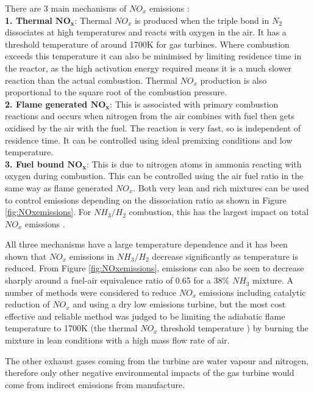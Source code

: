 There are 3 main mechanisms of $NO_x$ emissions \cite{netl}:\\ 
\textbf{1. Thermal $\mathbf{NO_x}$}: Thermal $NO_x$ is produced when the triple bond in $N_2$ dissociates at high temperatures and reacts with oxygen in the air. It has a threshold temperature of around 1700K for gas turbines. Where combustion exceeds this temperature it can also be minimised by limiting residence time in the reactor, as the high activation energy required means it is a much slower reaction than the actual combustion. Thermal $NO_x$ production is also proportional to the square root of the combustion pressure.
\\\textbf{2. Flame generated $\mathbf{NO_x}$}: This is associated with primary combustion reactions and occurs when nitrogen from the air combines with fuel then gets oxidised by the air with the fuel. The reaction is very fast, so is independent of residence time. It can be controlled using ideal premixing conditions and low temperature.
\\\textbf{3. Fuel bound $\mathbf{NO_x}$}: This is due to nitrogen atoms in ammonia reacting with oxygen during combustion. This can be controlled using the air fuel ratio in the same way as flame generated $NO_x$. Both very lean and rich mixtures can be used to control emissions depending on the dissociation ratio as shown in Figure \ref{fig:NOxemissions}. For $NH_3/H_2$ combustion, this has the largest impact on total $NO_x$ emissions \cite{junLi}. 
  
All three mechanisms have a large temperature dependence and it has been shown that $NO_x$ emissions in $NH_3/H_2$ decrease significantly as temperature is reduced. From Figure \ref{fig:NOxemissions}, emissions can also be seen to decrease sharply around a fuel-air equivalence ratio of 0.65 for a $38\%$ $NH_3$ mixture. A number of methods were considered to reduce $NO_x$ emissions including catalytic reduction of $NO_x$ and using a dry low emissions turbine, but the most cost effective and reliable method was judged to be limiting the adiabatic flame temperature to 1700K (the thermal $NO_x$ threshold temperature \cite{netl}) by burning the mixture in lean conditions with a high mass flow rate of air.

The other exhaust gases coming from the turbine are water vapour and nitrogen, therefore only other negative environmental impacts of the gas turbine would come from indirect emissions from manufacture.

